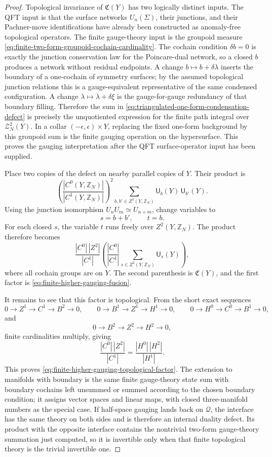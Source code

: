 \begin{proof}
Topological invariance of \(\mathfrak C(Y)\) has two logically distinct
inputs.  The QFT input is that the surface networks \(U_n(\Sigma)\), their
junctions, and their Pachner-move identifications have already been
constructed as anomaly-free topological operators.  The finite gauge-theory
input is the groupoid measure
\eqref{eq:finite-two-form-groupoid-cochain-cardinality}.  The cochain
condition \(\delta b=0\) is exactly the junction conservation law for the
Poincare-dual network, so a closed \(b\) produces a network without residual
endpoints.  A change \(b\mapsto b+\delta\lambda\) inserts the boundary of a
one-cochain of symmetry surfaces; by the assumed topological junction
relations this is a gauge-equivalent representative of the same condensed
configuration.  A change \(\lambda\mapsto\lambda+\delta\xi\) is the
gauge-for-gauge redundancy of that boundary filling.  Therefore the sum in
\eqref{eq:triangulated-one-form-condensation-defect} is precisely the
unquotiented expression for the finite path integral over
\(\mathcal Z_N^2(Y)\).  In a collar
\((- \epsilon,\epsilon)\times Y\), replacing the fixed one-form background by
this groupoid sum is the finite gauging operation on the hypersurface.  This
proves the gauging interpretation after the QFT surface-operator input has
been supplied.

Place two copies of the defect on nearby parallel copies of \(Y\).  Their
product is
\[
  \left(\frac{|C^0(Y,\mathbb Z_N)|}{|C^1(Y,\mathbb Z_N)|}\right)^2
  \sum_{b,b'\in Z^2(Y,\mathbb Z_N)}
  \mathsf U_b(Y)\,\mathsf U_{b'}(Y).
\]
Using the junction isomorphism \(U_nU_m\simeq U_{n+m}\), change variables to
\[
  s=b+b',\qquad t=b .
\]
For each closed \(s\), the variable \(t\) runs freely over
\(Z^2(Y,\mathbb Z_N)\).  The product therefore becomes
\[
  \frac{|C^0|\,|Z^2|}{|C^1|}
  \left(
    \frac{|C^0|}{|C^1|}
    \sum_{s\in Z^2(Y,\mathbb Z_N)}\mathsf U_s(Y)
  \right),
\]
where all cochain groups are on \(Y\).  The second parenthesis is
\(\mathfrak C(Y)\), and the first factor is
\eqref{eq:finite-higher-gauging-fusion}.

It remains to see that this factor is topological.  From the short exact
sequences
\[
  0\to Z^1\to C^1\to B^2\to0,\qquad
  0\to B^1\to Z^1\to H^1\to0,\qquad
  0\to H^0\to C^0\to B^1\to0,
\]
and
\[
  0\to B^2\to Z^2\to H^2\to0,
\]
finite cardinalities multiply, giving
\[
  \frac{|C^0|\,|Z^2|}{|C^1|}
  =
  \frac{|H^0|\,|H^2|}{|H^1|}.
\]
This proves \eqref{eq:finite-higher-gauging-topological-factor}.  The
extension to manifolds with boundary is the same finite gauge-theory state
sum with boundary cochains left unsummed or summed according to the chosen
boundary condition; it assigns vector spaces and linear maps, with closed
three-manifold numbers as the special case.  If half-space gauging lands back
on \(\mathcal Q\), the interface has the same theory on both sides and is
therefore an internal
duality defect.  Its product with the opposite interface contains the
nontrivial two-form gauge-theory summation just computed, so it is invertible
only when that finite topological theory is the trivial invertible one.
\end{proof}

